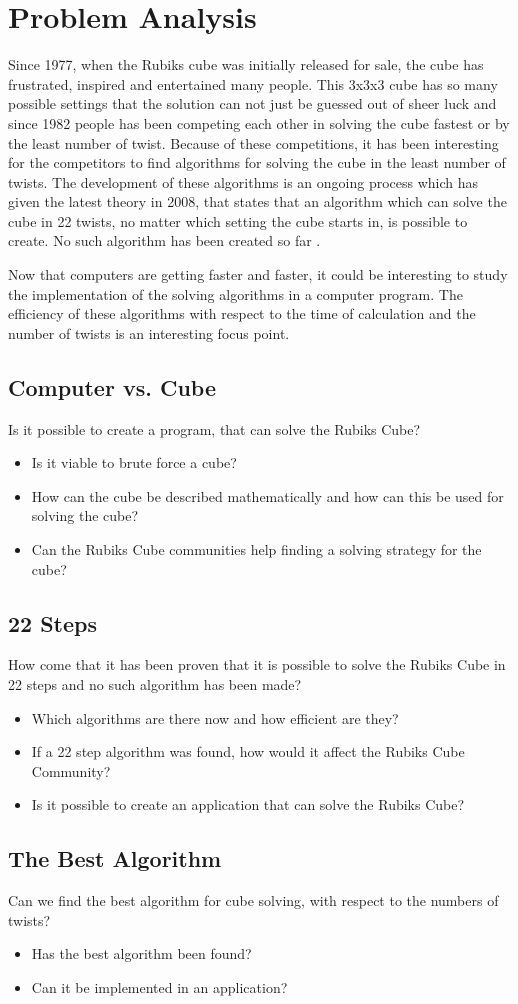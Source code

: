 \documentclass{report}
\begin{document}
\chapter{Problem Analysis}
Since 1977, when the Rubiks cube was initially released for sale, the cube has frustrated, inspired and entertained many people. This 3x3x3 cube has so many possible settings that the solution can not just be guessed out of sheer luck and since 1982 people has been competing each other in solving the cube fastest or by the least number of twist. Because of these competitions, it has been interesting for the competitors to find algorithms for solving the cube in the least number of twists. The development of these algorithms is an ongoing process which has given the latest theory in 2008, that states that an algorithm which can solve the cube in 22 twists, no matter which setting the cube starts in, is possible to create. No such algorithm has been created so far \cite{}.

Now that computers are getting faster and faster, it could be interesting to study the implementation of the solving algorithms in a computer program. The efficiency of these algorithms with respect to the time of calculation and the number of twists is an interesting focus point.
\section{Computer vs. Cube}
Is it possible to create a program, that can solve the Rubiks Cube?
\begin{itemize}
	\item Is it viable to brute force a cube?
	\item How can the cube be described mathematically and how can this be used for solving the cube?
	\item Can the Rubiks Cube communities help finding a solving strategy for the cube?
\end{itemize}

\section{22 Steps}
How come that it has been proven that it is possible to solve the Rubiks Cube in 22 steps and no such algorithm has been made?
\begin{itemize}
	\item Which algorithms are there now and how efficient are they?
	\item If a 22 step algorithm was found, how would it affect the Rubiks Cube Community?
	\item Is it possible to create an application that can solve the Rubiks Cube?
\end{itemize}

\section{The Best Algorithm}
Can we find the best algorithm for cube solving, with respect to the numbers of twists?
\begin{itemize}
	\item Has the best algorithm been found?
	\item Can it be implemented in an application?
\end{itemize}
\end{document}
